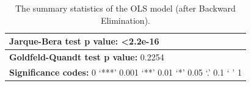 \begin{table}[]
\begin{tabular}{|llllll|}
\multicolumn{6}{|l|}{\textbf{Jarque-Bera test p value:} \textless 2.2e-16}                                                                                                                       \\ \hline
\multicolumn{6}{|l|}{\textbf{Goldfeld-Quandt test p value:} 0.2254}                                                                                                                              \\ \hline \hline
\multicolumn{6}{|l|}{\textbf{Significance codes:} 0 ‘***’ 0.001 ‘**’ 0.01 ‘*’ 0.05 ‘.’ 0.1 ‘ ’ 1}                                                                                                \\ \hline
\end{tabular}
\caption{
The summary statistics of the OLS model (after Backward Elimination).
}
\label{tab: A4.2}
\end{table}

